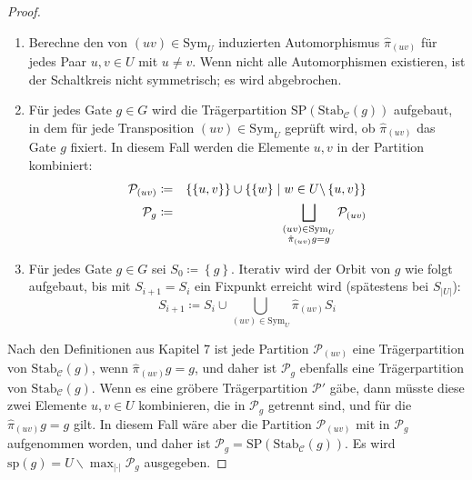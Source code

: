 \begin{proof}
\begin{enumerate}
\item Berechne den von $\left(uv\right)\in\mathrm{Sym}_{U}$ induzierten
Automorphismus $\hat{\pi}_{\left(uv\right)}$ für jedes Paar $u,v\in U$
mit $u\neq v$. Wenn nicht alle Automorphismen existieren, ist der
Schaltkreis nicht symmetrisch; es wird abgebrochen.
\item Für jedes Gate $g\in G$ wird die Trägerpartition $\mathrm{SP}\left(\mathrm{Stab}_{\mathcal{C}}\left(g\right)\right)$
aufgebaut, in dem für jede Transposition $\left(uv\right)\in\mathrm{Sym}_{U}$
geprüft wird, ob $\hat{\pi}_{\left(uv\right)}$ das Gate $g$ fixiert.
In diesem Fall werden die Elemente $u,v$ in der Partition kombiniert:
\begin{eqnarray*}
\mathcal{P}_{\left(uv\right)} & \coloneqq & \left\{ \left\{ u,v\right\} \right\} \cup\left\{ \left\{ w\right\} \mid w\in U\backslash\left\{ u,v\right\} \right\} \\
\mathcal{P}_{g} & \coloneqq & \bigsqcup_{\begin{subarray}{c}
\left(uv\right)\in\mathrm{Sym}_{U}\\
\hat{\pi}_{\left(uv\right)}g=g
\end{subarray}}\mathcal{P}_{\left(uv\right)}
\end{eqnarray*}
\item Für jedes Gate $g\in G$ sei $S_{0}\coloneqq\left\{ g\right\} $.
Iterativ wird der Orbit von $g$ wie folgt aufgebaut, bis mit $S_{i+1}=S_{i}$
ein Fixpunkt erreicht wird (spätestens bei $S_{\left|U\right|}$):
\[
S_{i+1}\coloneqq S_{i}\cup\bigcup_{\left(uv\right)\in\mathrm{Sym}_{U}}\hat{\pi}_{\left(uv\right)}S_{i}
\]
\end{enumerate}
Nach den Definitionen aus Kapitel 7 ist jede Partition $\mathcal{P}_{\left(uv\right)}$
eine Trägerpartition von $\mathrm{Stab}_{\mathcal{C}}\left(g\right)$,
wenn $\hat{\pi}_{\left(uv\right)}g=g$, und daher ist $\mathcal{P}_{g}$
ebenfalls eine Trägerpartition von $\mathrm{Stab}_{\mathcal{C}}\left(g\right)$.
Wenn es eine gröbere Trägerpartition $\mathcal{P}'$ gäbe, dann müsste
diese zwei Elemente $u,v\in U$ kombinieren, die in $\mathcal{P}_{g}$
getrennt sind, und für die $\hat{\pi}_{\left(uv\right)}g=g$ gilt.
In diesem Fall wäre aber die Partition $\mathcal{P}_{\left(uv\right)}$
mit in $\mathcal{P}_{g}$ aufgenommen worden, und daher ist $\mathcal{P}_{g}=\mathrm{SP}\left(\mathrm{Stab}_{\mathcal{C}}\left(g\right)\right)$.
Es wird $\mathrm{sp}\left(g\right)=U\backslash\max_{\left|\cdot\right|}\mathcal{P}_{g}$
ausgegeben.


\end{proof}
